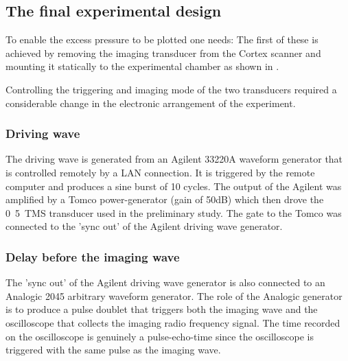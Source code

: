 

\subsection{The final experimental design} \label{sec:exp:finalDesign}

To enable the excess pressure to be plotted one needs:
The first of these is achieved by removing the imaging transducer from the Cortex scanner
and mounting it statically to the experimental chamber as shown in .

Controlling the triggering and imaging mode of the two transducers 
required a considerable change in the electronic arrangement of the experiment.




\subsubsection{Driving wave}
The driving wave is generated from an Agilent  33220A waveform generator
that is controlled remotely by a LAN connection.
It is triggered by the remote computer and produces  a sine burst of 10 cycles.
The output of the Agilent was amplified by a  Tomco power-generator (gain of \unit{50}dB)
which then drove the \unit{0.5}\mega\hertz\ TMS transducer used in the preliminary study.
The gate to the Tomco was connected to the 'sync out' of the Agilent driving wave generator.


\subsubsection{Delay before the imaging wave}
The 'sync out' of the Agilent driving wave generator is also connected to 
an Analogic 2045 arbitrary waveform generator.
The role of the Analogic generator is to produce 
a pulse doublet that  triggers both the imaging wave
and  the oscilloscope that collects the imaging radio frequency signal.
The time recorded on the oscilloscope is genuinely a pulse-echo-time since the oscilloscope is triggered with the same pulse as the imaging wave.

